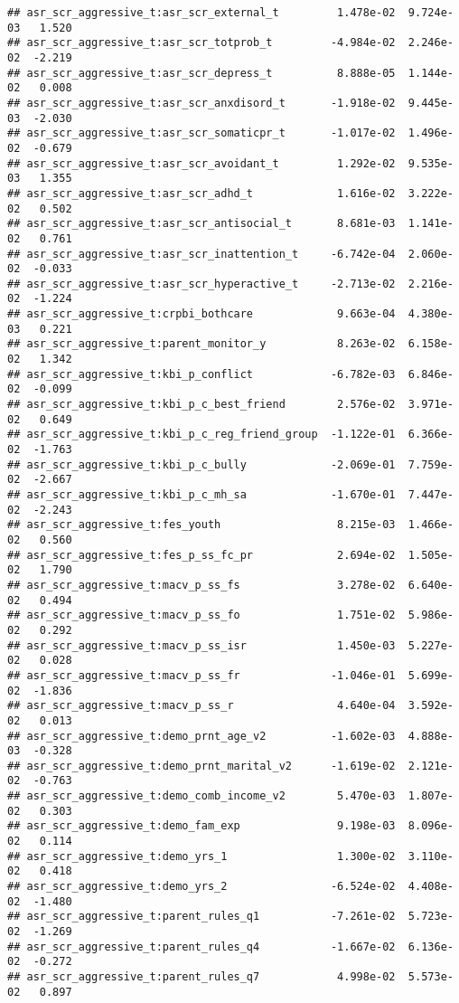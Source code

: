 \documentclass[
]{article}
\begin{document}
\begin{verbatim}
## asr_scr_aggressive_t:asr_scr_external_t         1.478e-02  9.724e-03   1.520
## asr_scr_aggressive_t:asr_scr_totprob_t         -4.984e-02  2.246e-02  -2.219
## asr_scr_aggressive_t:asr_scr_depress_t          8.888e-05  1.144e-02   0.008
## asr_scr_aggressive_t:asr_scr_anxdisord_t       -1.918e-02  9.445e-03  -2.030
## asr_scr_aggressive_t:asr_scr_somaticpr_t       -1.017e-02  1.496e-02  -0.679
## asr_scr_aggressive_t:asr_scr_avoidant_t         1.292e-02  9.535e-03   1.355
## asr_scr_aggressive_t:asr_scr_adhd_t             1.616e-02  3.222e-02   0.502
## asr_scr_aggressive_t:asr_scr_antisocial_t       8.681e-03  1.141e-02   0.761
## asr_scr_aggressive_t:asr_scr_inattention_t     -6.742e-04  2.060e-02  -0.033
## asr_scr_aggressive_t:asr_scr_hyperactive_t     -2.713e-02  2.216e-02  -1.224
## asr_scr_aggressive_t:crpbi_bothcare             9.663e-04  4.380e-03   0.221
## asr_scr_aggressive_t:parent_monitor_y           8.263e-02  6.158e-02   1.342
## asr_scr_aggressive_t:kbi_p_conflict            -6.782e-03  6.846e-02  -0.099
## asr_scr_aggressive_t:kbi_p_c_best_friend        2.576e-02  3.971e-02   0.649
## asr_scr_aggressive_t:kbi_p_c_reg_friend_group  -1.122e-01  6.366e-02  -1.763
## asr_scr_aggressive_t:kbi_p_c_bully             -2.069e-01  7.759e-02  -2.667
## asr_scr_aggressive_t:kbi_p_c_mh_sa             -1.670e-01  7.447e-02  -2.243
## asr_scr_aggressive_t:fes_youth                  8.215e-03  1.466e-02   0.560
## asr_scr_aggressive_t:fes_p_ss_fc_pr             2.694e-02  1.505e-02   1.790
## asr_scr_aggressive_t:macv_p_ss_fs               3.278e-02  6.640e-02   0.494
## asr_scr_aggressive_t:macv_p_ss_fo               1.751e-02  5.986e-02   0.292
## asr_scr_aggressive_t:macv_p_ss_isr              1.450e-03  5.227e-02   0.028
## asr_scr_aggressive_t:macv_p_ss_fr              -1.046e-01  5.699e-02  -1.836
## asr_scr_aggressive_t:macv_p_ss_r                4.640e-04  3.592e-02   0.013
## asr_scr_aggressive_t:demo_prnt_age_v2          -1.602e-03  4.888e-03  -0.328
## asr_scr_aggressive_t:demo_prnt_marital_v2      -1.619e-02  2.121e-02  -0.763
## asr_scr_aggressive_t:demo_comb_income_v2        5.470e-03  1.807e-02   0.303
## asr_scr_aggressive_t:demo_fam_exp               9.198e-03  8.096e-02   0.114
## asr_scr_aggressive_t:demo_yrs_1                 1.300e-02  3.110e-02   0.418
## asr_scr_aggressive_t:demo_yrs_2                -6.524e-02  4.408e-02  -1.480
## asr_scr_aggressive_t:parent_rules_q1           -7.261e-02  5.723e-02  -1.269
## asr_scr_aggressive_t:parent_rules_q4           -1.667e-02  6.136e-02  -0.272
## asr_scr_aggressive_t:parent_rules_q7            4.998e-02  5.573e-02   0.897

\end{verbatim}
\end{document}
